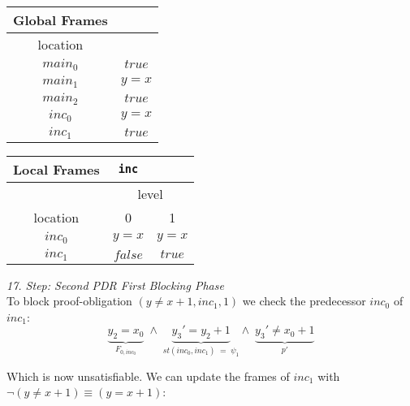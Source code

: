 \documentclass{article}
\begin{document}
	\begin{minipage}{.4\textwidth}
	\setlength\tabcolsep{0.35em}
	\begin{center}
		\begin{tabu}{cc}
			Global Frames \\
			\toprule
			location &  \\
			$main_0$ & $true$  \\
			$main_1$ & $y = x$\\
			$main_2$ & $true$ \\
			$inc_0$ & $y = x$  \\
			$inc_1$ & $true$\\
			\bottomrule
		\end{tabu}
	\end{center}
\end{minipage}
\hfill
\begin{minipage}{.5\textwidth}
	\setlength\tabcolsep{0.35em}
	\begin{center}
		\begin{tabu}{ccc}
			Local Frames & \texttt{inc}\\
			\toprule
			& \multicolumn{2}{c}{level} \\
			\cmidrule(lr){2-3}
			location & 0 & 1  \\
			\cmidrule{1-3}
			$inc_0$ & $y = x$ & $y = x$  \\
			$inc_1$ & $false$ & $true$ \\
			\bottomrule
		\end{tabu}
	\end{center}	
\end{minipage}

\vspace*{1em}

\textsl{17. Step: Second PDR First Blocking Phase} \\
To block proof-obligation $(y \neq x + 1, inc_1, 1)$ we check the predecessor $inc_0$ of $inc_1$: \\
\begin{equation*}
\underbrace{y_2 = x_0}_{F_{0, inc_0}}\; \land \; \underbrace{y_3' = y_2 + 1}_{st(inc_0, inc_1)\; = \; \psi_1} \land \; \underbrace{y_3' \neq x_0 + 1}_{p'}
\end{equation*}

Which is now unsatisfiable. We can update the frames of $inc_1$ with $\neg(y \neq x + 1) \equiv (y = x + 1)$: \\ \\
\end{document}
